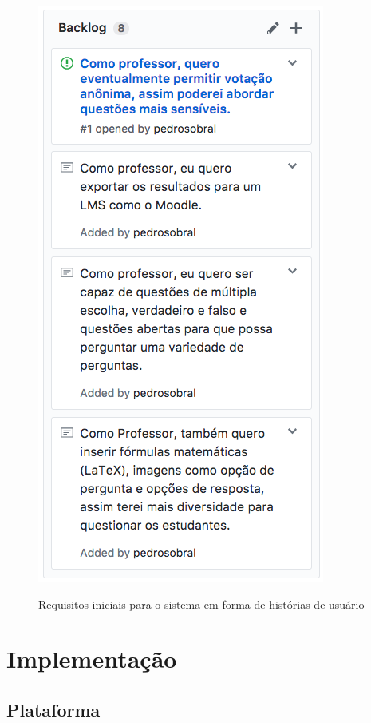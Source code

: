 \begin{figure}
{    \includegraphics[scale=0.65,valign=t]{imagens/backlog2.png}
  }
  \caption{Requisitos iniciais para o sistema em forma de histórias de usuário}
  \label{fig:backlog}
\end{figure}


\section{Implementação}

\subsection{Plataforma}

